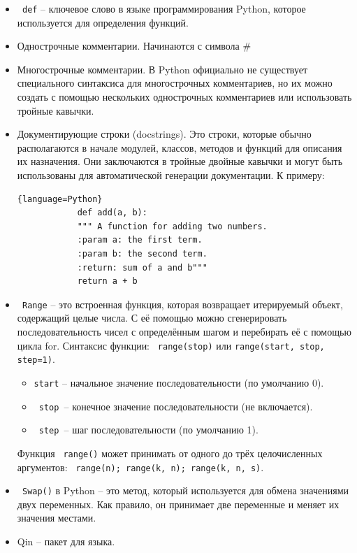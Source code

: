 \documentclass[12pt,a4paper]{article}
\begin{document}
\begin{itemize}
		\item	\texttt{	def} -- ключевое слово в языке программирования Python, которое используется для определения функций.
		
		\item		Однострочные комментарии. Начинаются с символа \#
		\item		Многострочные комментарии. В Python официально не существует специального синтаксиса для многострочных комментариев, но их можно создать с помощью нескольких однострочных комментариев или использовать тройные кавычки.
		
		\item	Документирующие строки (docstrings). Это строки, которые обычно располагаются в начале модулей, классов, методов и функций для описания их назначения. Они заключаются в тройные двойные кавычки и могут быть использованы для автоматической генерации документации. К примеру: 
		\begin{lstlisting}{language=Python}
			def add(a, b):
			"""	A function for adding two numbers.
			:param a: the first term.
			:param b: the second term.
			:return: sum of a and b"""
			return a + b
		\end{lstlisting}
		
		\item	\texttt{	Range} -- это встроенная функция, которая возвращает итерируемый объект, содержащий целые числа. С её помощью можно сгенерировать последовательность чисел с определённым шагом и перебирать её с помощью цикла for. Синтаксис функции: \texttt{ range(stop)}  или \texttt{range(start, stop, step=1)}.
		\begin{itemize}
			\item	\texttt{start} -- начальное значение последовательности (по умолчанию 0).
			\item \texttt{	stop }-- конечное значение последовательности (не включается).
			\item	\texttt{	step }-- шаг последовательности (по умолчанию 1).
		\end{itemize}
		Функция \texttt{ range()} может принимать от одного до трёх целочисленных аргументов:
		\texttt{	range(n); range(k, n); range(k, n, s)}.
		
		\item \texttt{	Swap()} в Python -- это метод, который используется для обмена значениями двух переменных. Как правило, он принимает две переменные и меняет их значения местами.
		
		\item	Qin -- пакет для языка.
		

\end{itemize}
\end{document}

